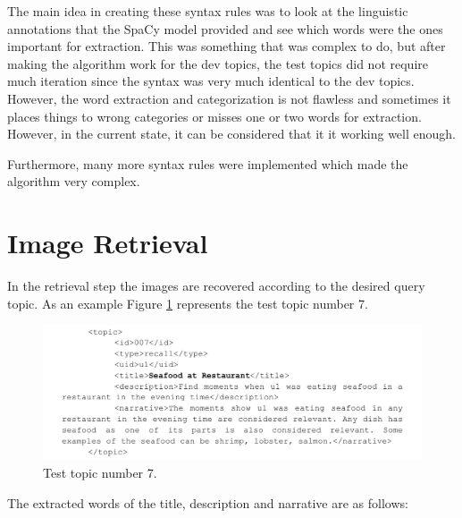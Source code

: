     

    
    
    The main idea in creating these syntax rules was to look at the linguistic annotations that the SpaCy model provided and see which words were the ones important for extraction. This was something that was complex to do, but after making the algorithm work for the dev topics, the test topics did not require much iteration since the syntax was very much identical to the dev topics. However, the word extraction and categorization is not flawless and sometimes it places things to wrong categories or misses one or two words for extraction. However, in the current state, it can be considered that it it working well enough. 
        
    Furthermore, many more syntax rules were implemented which made the algorithm very complex.
  



\section{Image Retrieval}
\label{sec:retrieval}

    In the retrieval step the images are recovered according to the desired query topic.
    As an example Figure \ref{fig:testtopic} represents the test topic number 7.
   
    \begin{figure}[H]
        \centering
        \captionsetup{justification=centering}
        \includegraphics[width = \textwidth]{Sections/6textprocessing/images/topic.png}
        \caption{Test topic number 7.}
        \label{fig:testtopic}
      \end{figure}
      
      The extracted words of the title, description and narrative are as follows:

